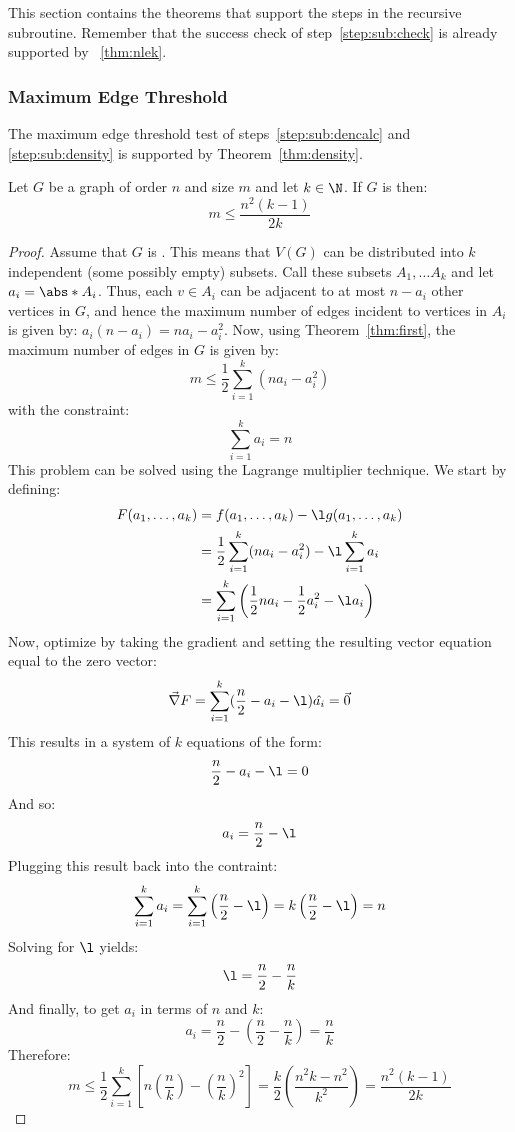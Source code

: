This section contains the theorems that support the steps in the recursive subroutine.  Remember that the success
check of step~\ref{step:sub:check} is already supported by \theoremname~\ref{thm:nlek}.

\subsubsection{Maximum Edge Threshold}\label{sec:sub:sub:edges}

The maximum edge threshold test of steps~\ref{step:sub:dencalc} and \ref{step:sub:density} is supported by
Theorem~\ref{thm:density}.

\begin{theorem}
  \label{thm:density}
  Let \(G\) be a graph of order \(n\) and size \(m\) and let \(k\in\N\).  If \(G\) is  then:
  \[m\le\frac{n^2(k-1)}{2k}\]
\end{theorem}

\begin{proof}
  Assume that \(G\) is .  This means that \(V(G)\) can be distributed into \(k\) independent (some
  possibly empty) subsets.  Call these subsets \(A_1,\ldots A_k\) and let \(a_i=\abs*{A_i}\).  Thus, each \(v\in
  A_i\) can be adjacent to at most \(n-a_i\) other vertices in \(G\), and hence the maximum number of edges
  incident to vertices in \(A_i\) is given by: \(a_i(n-a_i)=na_i-a_i^2\).  Now, using Theorem~\ref{thm:first}, the
  maximum number of edges in \(G\) is given by:
  \[m\le\frac{1}{2}\sum_{i=1}^k(na_i-a_i^2)\]
  with the constraint:
  \[\sum_{i=1}^ka_i=n\]
  This problem can be solved using the Lagrange multiplier technique.  We start by defining:
  \begin{align*}
    F(a_1,\ldots,a_k) &= f(a_1,\ldots,a_k)-\l g(a_1,\ldots,a_k) \\
    &= \frac{1}{2}\sum_{i=1}^k(na_i-a_i^2)-\l\sum_{i=1}^ka_i \\
    &= \sum_{i=1}^k\left(\frac{1}{2}na_i-\frac{1}{2}a_i^2-\l a_i\right)
  \end{align*}
  Now, optimize by taking the gradient and setting the resulting vector equation equal to the zero vector:
  \[\vec{\nabla}F=\sum_{i=1}^k(\frac{n}{2}-a_i-\l)\hat{a_i}=\vec{0}\]
  This results in a system of \(k\) equations of the form:
  \[\frac{n}{2}-a_i-\l=0\]
  And so:
  \[a_i=\frac{n}{2}-\l\]
  Plugging this result back into the contraint:
  \[\sum_{i=1}^ka_i=\sum_{i=1}^k\left(\frac{n}{2}-\l\right)=k\left(\frac{n}{2}-\l\right)=n\]
  Solving for \(\l\) yields:
  \[\l=\frac{n}{2}-\frac{n}{k}\]
  And finally, to get \(a_i\) in terms of \(n\) and \(k\):
  \[a_i=\frac{n}{2}-\left(\frac{n}{2}-\frac{n}{k}\right)=\frac{n}{k}\]
  Therefore:
  \[m\le\frac{1}{2}\sum_{i=1}^k\left[n\left(\frac{n}{k}\right)-\left(\frac{n}{k}\right)^2\right]=
  \frac{k}{2}\left(\frac{n^2k-n^2}{k^2}\right)=\frac{n^2(k-1)}{2k}\]
\end{proof}

